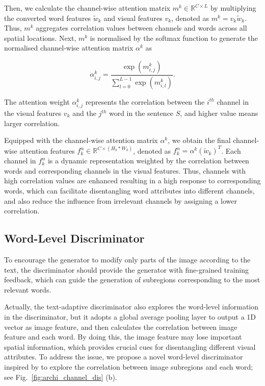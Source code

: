 Then, we calculate the channel-wise attention matrix $m^{k} \in \mathbb{R}^{C \times L}$ by multiplying the converted word features $\tilde{w}_{k}$ and visual features $v_{k}$, denoted as $m^{k}=v_{k}\tilde{w}_{k}$. Thus, $m^{k}$ aggregates correlation values between channels and words across all spatial locations. Next, $m^{k}$ is normalised by the softmax function to generate the normalised channel-wise attention matrix $\alpha^{k}$ as

\begin{equation}
\alpha^{k}_{i,j}=\frac{\exp(m^{k}_{i,j})}{\sum^{L-1}_{l=0}\exp(m^{k}_{i,l})}
\textrm{.}
\label{eqn:corr}
\end{equation}

The attention weight $\alpha^{k}_{i,j}$ represents the correlation between the $i^{th}$ channel in the visual features $v_{k}$ and the $j^{th}$ word in the sentence $S$, and higher value means larger correlation.

Equipped with the channel-wise attention matrix $\alpha^k$, we obtain the final channel-wise attention features $f^{\alpha}_k \in \mathbb{R}^{C\times (H_k \ast W_k)}$, denoted as $f^{\alpha}_k=\alpha^k (\tilde{w}_k)^{T}$. 
Each channel in $f^{\alpha}_k$ is a dynamic representation weighted by the correlation between words and corresponding channels in the visual features. Thus, channels with high correlation values are enhanced resulting in a high response to corresponding words, which can facilitate disentangling word attributes into different channels, and also reduce the influence from irrelevant channels by assigning a lower correlation.

\subsection{Word-Level Discriminator}
\label{sec:word}

To encourage the generator to modify only parts of the image according to the text, the discriminator should provide the generator with fine-grained training feedback, which can guide the generation of subregions corresponding to the most relevant words.

Actually, the text-adaptive discriminator \cite{nam2018text} also explores the word-level information in the discriminator, but it adopts a global average pooling layer to output a 1D vector as image feature, and then calculates the correlation between image feature and each word. By doing this, the image feature may lose important spatial information, which provides crucial cues for disentangling different visual attributes. To address the issue, we propose a novel word-level discriminator inspired by \cite{nam2018text} to explore the correlation between image subregions and each word; see Fig.~\ref{fig:archi_channel_dis} (b).

